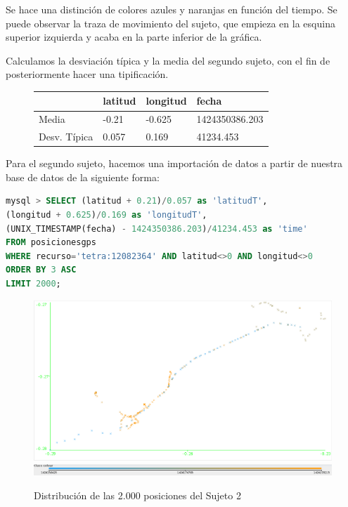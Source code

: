 \documentclass[a4paper, 12pt]{article}
\begin{document}
Se hace una distinci\'on de colores azules y naranjas en funci\'on del tiempo. Se puede observar la traza de movimiento del sujeto, que empieza en la esquina superior izquierda y acaba en la parte inferior de la gr\'afica. 

Calculamos la desviaci\'on t\'ipica y la media del segundo sujeto, con el fin de posteriormente hacer una tipificaci\'on.\\

\begin{figure}[H]
	\begin{tabular}{| l | l | l | l |}
	\hline
	\rowcolor{LightCyan}
	\hline
  		& latitud & longitud & fecha \\
	\hline
		Media & -0.21 &  -0.625 & 1424350386.203 \\
		Desv. T\'ipica & 0.057 & 0.169 & 41234.453 \\
	\hline
	\end{tabular}
\end{figure}

Para el segundo sujeto, hacemos una importaci\'on de datos a partir de nuestra base de datos de la siguiente forma:\\

\begin{lstlisting}[language=sql, columns=fullflexible, basicstyle=\small, frame=tblr]
mysql > SELECT (latitud + 0.21)/0.057 as 'latitudT', 
(longitud + 0.625)/0.169 as 'longitudT', 
(UNIX_TIMESTAMP(fecha) - 1424350386.203)/41234.453 as 'time'
FROM posicionesgps
WHERE recurso='tetra:12082364' AND latitud<>0 AND longitud<>0
ORDER BY 3 ASC
LIMIT 2000;
\end{lstlisting}

\begin{figure}[H]
	\includegraphics[scale=.5]{../comparativa/sujeto2.png}
	\includegraphics[scale=.4]{../comparativa/leyenda.png}
	\caption{Distribuci\'on de las 2.000 posiciones del Sujeto 2}
\end{figure}
\end{document}
